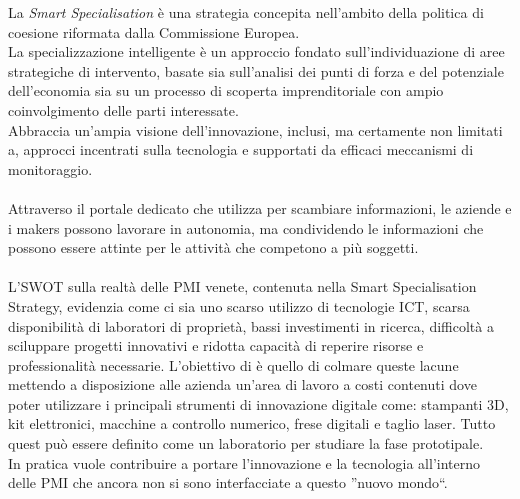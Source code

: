 La \textit{Smart Specialisation} è una strategia concepita nell'ambito della politica di coesione riformata dalla Commissione Europea.\\
La specializzazione intelligente è un approccio fondato sull'individuazione di aree strategiche di intervento, basate sia sull'analisi dei punti di forza e del potenziale dell'economia sia su un processo di scoperta imprenditoriale con ampio coinvolgimento delle parti interessate.\\
Abbraccia un'ampia visione dell'innovazione, inclusi, ma certamente non limitati a, approcci incentrati sulla tecnologia e supportati da efficaci meccanismi di monitoraggio.\\
\\
Attraverso il portale dedicato che \lab{} utilizza per scambiare informazioni, le aziende e i makers possono lavorare in autonomia, ma condividendo le informazioni che possono essere attinte per le attività che competono a più soggetti.\\
\\
L'\gls{SWOT} sulla realtà delle PMI venete, contenuta nella Smart Specialisation Strategy, evidenzia come ci sia uno scarso utilizzo di tecnologie ICT, scarsa disponibilità di laboratori di proprietà, bassi investimenti in ricerca, difficoltà a sciluppare progetti innovativi e ridotta capacità di reperire risorse e professionalità necessarie. 
L'obiettivo di \lab{} è quello di colmare queste lacune mettendo a disposizione alle azienda un'area di lavoro a costi contenuti dove poter utilizzare i principali strumenti di innovazione digitale come: stampanti 3D, kit elettronici, macchine a controllo numerico, frese digitali e taglio laser. Tutto quest può essere definito come un laboratorio per studiare la fase prototipale.
\\
In pratica \lab{} vuole contribuire a portare l'innovazione e la tecnologia all'interno delle PMI che ancora non si sono interfacciate a questo ''nuovo mondo``.

